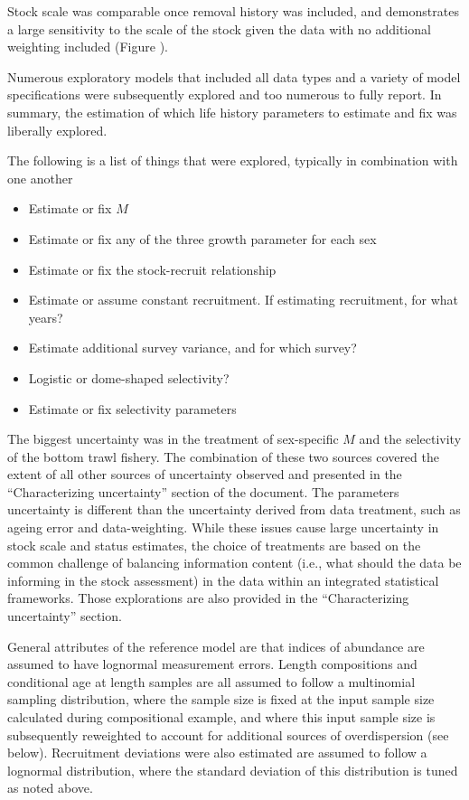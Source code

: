 \documentclass[
]{scrartcl}
\providecommand{\tightlist}{%
  \setlength{\itemsep}{0pt}\setlength{\parskip}{0pt}}\usepackage{longtable,booktabs,array}
\begin{document}
Stock scale was comparable once removal history was included, and
demonstrates a large sensitivity to the scale of the stock given the
data with no additional weighting included (Figure ).

Numerous exploratory models that included all data types and a variety
of model specifications were subsequently explored and too numerous to
fully report. In summary, the estimation of which life history
parameters to estimate and fix was liberally explored.

The following is a list of things that were explored, typically in
combination with one another

\begin{itemize}
\tightlist
\item
  Estimate or fix \(M\)
\item
  Estimate or fix any of the three growth parameter for each sex
\item
  Estimate or fix the stock-recruit relationship
\item
  Estimate or assume constant recruitment. If estimating recruitment,
  for what years?
\item
  Estimate additional survey variance, and for which survey?
\item
  Logistic or dome-shaped selectivity?
\item
  Estimate or fix selectivity parameters
\end{itemize}

The biggest uncertainty was in the treatment of sex-specific \(M\) and
the selectivity of the bottom trawl fishery. The combination of these
two sources covered the extent of all other sources of uncertainty
observed and presented in the ``Characterizing uncertainty'' section of
the document. The parameters uncertainty is different than the
uncertainty derived from data treatment, such as ageing error and
data-weighting. While these issues cause large uncertainty in stock
scale and status estimates, the choice of treatments are based on the
common challenge of balancing information content (i.e., what should the
data be informing in the stock assessment) in the data within an
integrated statistical frameworks. Those explorations are also provided
in the ``Characterizing uncertainty'' section.

General attributes of the reference model are that indices of abundance
are assumed to have lognormal measurement errors. Length compositions
and conditional age at length samples are all assumed to follow a
multinomial sampling distribution, where the sample size is fixed at the
input sample size calculated during compositional example, and where
this input sample size is subsequently reweighted to account for
additional sources of overdispersion (see below). Recruitment deviations
were also estimated are assumed to follow a lognormal distribution,
where the standard deviation of this distribution is tuned as noted
above.
\end{document}
